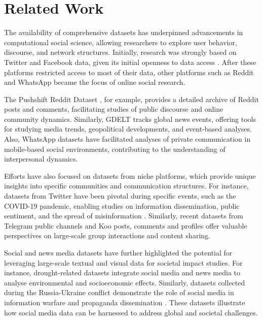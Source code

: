 \section{Related Work}


The availability of comprehensive datasets has underpinned advancements in computational social science, allowing researchers to explore user behavior, discourse, and network structures. Initially, research was strongly based on Twitter and Facebook data, given its initial openness to data access \cite{dooms2013movietweetings,lewis2008tastes}. After these platforms restricted access to most of their data, other platforms such as Reddit and WhatsApp became the focus of online social research. 

The Pushshift Reddit Dataset \cite{baumgartner2020pushshiftredditdataset}, for example, provides a detailed archive of Reddit posts and comments, facilitating studies of public discourse and online community dynamics. Similarly, GDELT \cite{Leetaru13gdelt:global} tracks global news events, offering tools for studying media trends, geopolitical developments, and event-based analyses. Also, WhatsApp datasets \cite{Seufert2023} have facilitated analyses of private communication in mobile-based social environments, contributing to the understanding of interpersonal dynamics.

Efforts have also focused on datasets from niche platforms, which provide unique insights into specific communities and communication structures. For instance, datasets from Twitter have been pivotal during specific events, such as the COVID-19 pandemic, enabling studies on information dissemination, public sentiment, and the spread of misinformation \cite{https://doi.org/10.5281/zenodo.7834392}. Similarly, recent datasets from Telegram public channels \cite{https://doi.org/10.5281/zenodo.7640712} and Koo posts, comments and profiles \cite{koo_Mekacher_Falkenberg_Baronchelli_2024} offer valuable perspectives on large-scale group interactions and content sharing. 

Social and news media datasets have further highlighted the potential for leveraging large-scale textual and visual data for societal impact studies. For instance, drought-related datasets \cite{Shang_Chen_Vora_Zhang_Cai_Wang_2024} integrate social media and news media to analyse environmental and socioeconomic effects. Similarly, datasets collected during the Russia-Ukraine conflict demonstrate the role of social media in information warfare and propaganda dissemination \cite{Ai_Gupta_Oak_Hui_Liu_Hirschberg_2024}. These datasets illustrate how social media data can be harnessed to address global and societal challenges.

